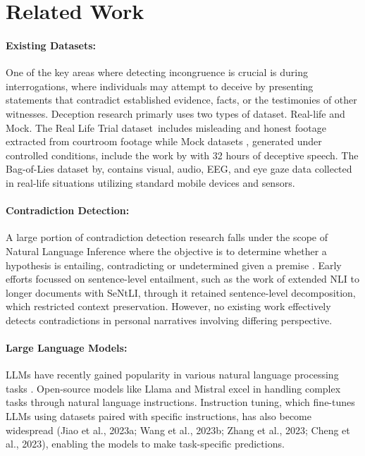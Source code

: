 \section{Related Work}
\paragraph{Existing Datasets:} One of the key areas where detecting incongruence is crucial is during interrogations, where individuals may attempt to deceive by presenting statements that contradict established evidence, facts, or the testimonies of other witnesses. Deception research primarly uses two types of dataset. Real-life and Mock. The Real Life Trial dataset \cite{perez2015verbal}\,includes misleading and honest footage extracted from courtroom footage while Mock datasets , generated under controlled conditions, include the work by \cite{CSC} with 32 hours of deceptive speech.
The Bag-of-Lies dataset by\cite{Bag-of-lies}, contains visual, audio, EEG, and eye gaze data collected in real-life situations utilizing standard mobile devices and sensors.
\vspace{-0.3cm}
\paragraph{Contradiction Detection:} A large portion of contradiction detection research falls under the scope of Natural Language Inference where the objective is to determine whether a hypothesis is entailing, contradicting or undetermined given a premise \cite{stanford-nlp-manning}. Early efforts focussed on sentence-level entailment, such as the work of \cite{Khot_Sabharwal_Clark_2018} \cite{schuster-etal-2022-stretching} extended NLI to longer documents with SeNtLI, through it retained sentence-level decomposition, which restricted context preservation.
However, no existing work effectively detects contradictions in personal narratives involving differing perspective.
\vspace{-0.3cm}
\paragraph{Large Language Models: } LLMs have recently gained popularity in various natural language processing tasks \cite{gpt}. Open-source models like Llama \cite{dubey2024llama} and Mistral \cite{jiang2023mistral} excel in handling complex tasks through natural language instructions. Instruction tuning, which fine-tunes LLMs using datasets paired with specific instructions, has also become widespread (Jiao et al., 2023a; Wang et al., 2023b; Zhang et al., 2023; Cheng et al., 2023), enabling the models to make task-specific predictions.

